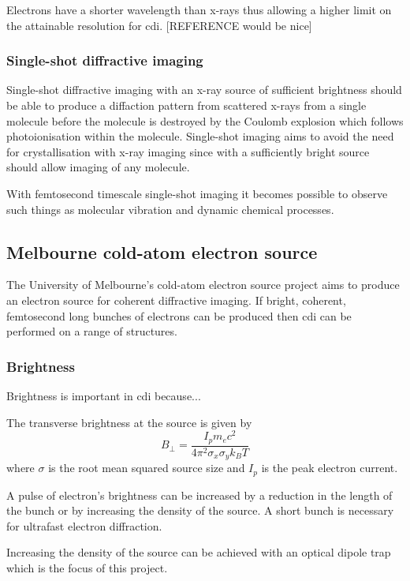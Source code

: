 Electrons have a shorter wavelength than x-rays thus allowing a higher limit on the attainable resolution for \gls{cdi}. [REFERENCE would be nice] 

\subsubsection{Single-shot diffractive imaging}
Single-shot diffractive imaging with an x-ray source of sufficient brightness should be able to produce a diffaction pattern from scattered x-rays from a single molecule before the molecule is destroyed by the Coulomb explosion which follows photoionisation within the molecule\cite{henderson_potential_1995, neutze_potential_2000}. Single-shot imaging aims to avoid the need for crystallisation with x-ray imaging since with a sufficiently bright source should allow imaging of any molecule.

With femtosecond timescale single-shot imaging it becomes possible to observe such things as molecular vibration and dynamic chemical processes\cite{zewail_4d_2006}.

\subsection{Melbourne cold-atom electron source}
The University of Melbourne's cold-atom electron source project aims to produce an electron source for coherent diffractive imaging. If bright, coherent, femtosecond long bunches of electrons can be produced then \gls{cdi} can be performed on a range of structures.

\subsubsection{Brightness}
Brightness is important in \gls{cdi} because...


The transverse brightness at the source is given by\cite{reiser_theory_2008}
\begin{equation}
B_\perp = \frac{I_p m_e c^2}{4 \pi^2 \sigma_x \sigma_y k_B T}
\end{equation}
where $\sigma$ is the root mean squared source size and $I_p$ is the peak electron current.

A pulse of electron's brightness can be increased by a reduction in the length of the bunch or by increasing the density of the source. A short bunch is necessary for ultrafast electron diffraction.

Increasing the density of the source can be achieved with an optical dipole trap which is the focus of this project.




